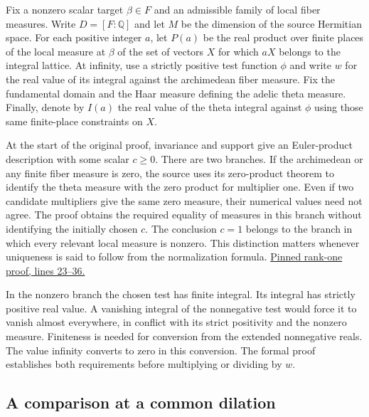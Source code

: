 \documentclass[12pt,letterpaper]{article}
\begin{document}
Fix a nonzero scalar target $\beta\in F$ and an admissible family of local fiber measures. Write $D=[F:\mathbb Q]$ and let $M$ be the dimension of the source Hermitian space. For each positive integer $a$, let $P(a)$ be the real product over finite places of the local measure at $\beta$ of the set of vectors $X$ for which $aX$ belongs to the integral lattice. At infinity, use a strictly positive test function $\phi$ and write $w$ for the real value of its integral against the archimedean fiber measure. Fix the fundamental domain and the Haar measure defining the adelic theta measure. Finally, denote by $I(a)$ the real value of the theta integral against $\phi$ using those same finite-place constraints on $X$.

At the start of the original proof, invariance and support give an Euler-product description with some scalar $c\ge0$. There are two branches. If the archimedean or any finite fiber measure is zero, the source uses its zero-product theorem to identify the theta measure with the zero product for multiplier one. Even if two candidate multipliers give the same zero measure, their numerical values need not agree. The proof obtains the required equality of measures in this branch without identifying the initially chosen $c$. The conclusion $c=1$ belongs to the branch in which every relevant local measure is nonzero. This distinction matters whenever uniqueness is said to follow from the normalization formula. \href{https://github.com/nousentllc/riemann-hypothesis/blob/40e56bab026552e089d7afcfeff08d2defb9c005/src/CompanionTheory/AutomorphicTheory/ThetaDilations/SwOne.lean#L23-L36}{Pinned rank-one proof, lines 23--36.}

In the nonzero branch the chosen test has finite integral. Its integral has strictly positive real value. A vanishing integral of the nonnegative test would force it to vanish almost everywhere, in conflict with its strict positivity and the nonzero measure. Finiteness is needed for conversion from the extended nonnegative reals. The value infinity converts to zero in this conversion. The formal proof establishes both requirements before multiplying or dividing by $w$.

\subsection{A comparison at a common dilation}
\end{document}
